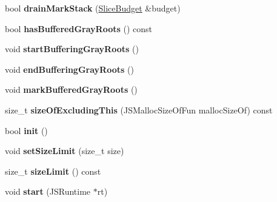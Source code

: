 \begin{DoxyCompactItemize}
\item 
\hypertarget{structjs_1_1_g_c_marker_a28e29a8252dbfa790d06b204e08265a7}{bool {\bfseries drain\-Mark\-Stack} (\hyperlink{structjs_1_1_slice_budget}{Slice\-Budget} \&budget)}\label{structjs_1_1_g_c_marker_a28e29a8252dbfa790d06b204e08265a7}

\item 
\hypertarget{structjs_1_1_g_c_marker_a1fec57d565b1ec061c9402fe2fa08aa0}{bool {\bfseries has\-Buffered\-Gray\-Roots} () const }\label{structjs_1_1_g_c_marker_a1fec57d565b1ec061c9402fe2fa08aa0}

\item 
\hypertarget{structjs_1_1_g_c_marker_a5884652ed1abee3d8575f1392f5d64de}{void {\bfseries start\-Buffering\-Gray\-Roots} ()}\label{structjs_1_1_g_c_marker_a5884652ed1abee3d8575f1392f5d64de}

\item 
\hypertarget{structjs_1_1_g_c_marker_a8a47c7a63066b0df7ab677b41035bafe}{void {\bfseries end\-Buffering\-Gray\-Roots} ()}\label{structjs_1_1_g_c_marker_a8a47c7a63066b0df7ab677b41035bafe}

\item 
\hypertarget{structjs_1_1_g_c_marker_a49bcba2ed1c08f036249858970aa66b0}{void {\bfseries mark\-Buffered\-Gray\-Roots} ()}\label{structjs_1_1_g_c_marker_a49bcba2ed1c08f036249858970aa66b0}

\item 
\hypertarget{structjs_1_1_g_c_marker_a805602503f2dfd4dbeb876767f651b76}{size\-\_\-t {\bfseries size\-Of\-Excluding\-This} (J\-S\-Malloc\-Size\-Of\-Fun malloc\-Size\-Of) const }\label{structjs_1_1_g_c_marker_a805602503f2dfd4dbeb876767f651b76}

\item 
\hypertarget{structjs_1_1_g_c_marker_a2f85342fada55e85961f23b729b52026}{bool {\bfseries init} ()}\label{structjs_1_1_g_c_marker_a2f85342fada55e85961f23b729b52026}

\item 
\hypertarget{structjs_1_1_g_c_marker_abc7b0839b18b11469d13ac00b29297c6}{void {\bfseries set\-Size\-Limit} (size\-\_\-t size)}\label{structjs_1_1_g_c_marker_abc7b0839b18b11469d13ac00b29297c6}

\item 
\hypertarget{structjs_1_1_g_c_marker_af399d9fd09b74daf7606ae1f8798af89}{size\-\_\-t {\bfseries size\-Limit} () const }\label{structjs_1_1_g_c_marker_af399d9fd09b74daf7606ae1f8798af89}

\item 
\hypertarget{structjs_1_1_g_c_marker_a328c418ebeb1fea7b54d879a8e1b89de}{void {\bfseries start} (J\-S\-Runtime $\ast$rt)}\label{structjs_1_1_g_c_marker_a328c418ebeb1fea7b54d879a8e1b89de}


\end{DoxyCompactItemize}
